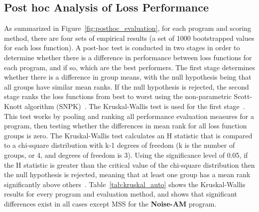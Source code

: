 \documentclass[lettersize,journal]{IEEEtran}
\providecommand{\gls}[1]{#1}
\newcommand{\AmpMod}{\textbf{Noise-AM}}
\begin{document}
\subsection{Post hoc Analysis of Loss Performance}
\label{sec:results_posthoc}
As summarized in Figure~\ref{fig:posthoc_evaluation}, for each program and scoring method, there are four sets of empirical results (a set of 1000 bootstrapped values for each loss function). A post-hoc test is conducted in two stages in order to determine whether there is a difference in performance between loss functions for each program, and if so, which are the best performers. The first stage determines whether there is a difference in group means, with the null hypothesis being that all groups have similar mean ranks. If the null hypothesis is rejected, the second stage ranks the loss functions from best to worst using the non-parametric Scott-Knott algorithm (\gls{SNPK})~\cite{tantithamthavorn2017mvt,tantithamthavorn2018optimization}.
The Kruskal-Wallis test is used for the first stage~\cite{kruskal1952use}. This test works by pooling and ranking all performance evaluation measures for a program, then testing whether the differences in mean rank for all loss function groups is zero. The Kruskal-Wallis test calculates an H statistic that is compared to a chi-square distribution with k-1 degrees of freedom (k is the number of groups, or 4, and degrees of freedom is 3). Using the significance level of 0.05, if the H statistic is greater than the critical value of the chi-square distribution then the null hypothesis is rejected, meaning that at least one group has a mean rank significantly above others~\cite{kruskal1952use}. Table~\ref{tab:kruskal_auto} shows the Kruskal-Wallis results for every program and evaluation method, and shows that significant differences exist in all cases except MSS for the \AmpMod{} program. 
\end{document}

